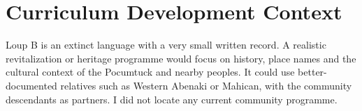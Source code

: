 \documentclass[12pt]{article}
\begin{document}
\section{Curriculum Development Context}
Loup B is an extinct language with a very small written record. A realistic revitalization or heritage programme would focus on history, place names and the cultural context of the Pocumtuck and nearby peoples. It could use better-documented relatives such as Western Abenaki or Mahican, with the community descendants as partners. I did not locate any current community programme.
\end{document}
